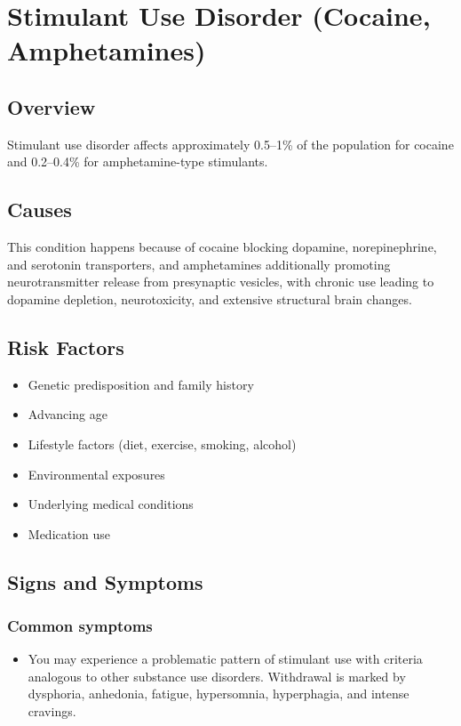 \chapter{Stimulant Use Disorder (Cocaine, Amphetamines)}
\label{sec:Stimulant Use Disorder (Cocaine, Amphetamines)}

\section{Overview}
Stimulant use disorder affects approximately 0.5--1\% of the population for cocaine and 0.2--0.4\% for amphetamine-type stimulants.
\section{Causes}
This condition happens because of cocaine blocking dopamine, norepinephrine, and serotonin transporters, and amphetamines additionally promoting neurotransmitter release from presynaptic vesicles, with chronic use leading to dopamine depletion, neurotoxicity, and extensive structural brain changes.     
\section{Risk Factors}

\begin{itemize}[noitemsep]
  \item Genetic predisposition and family history
  \item Advancing age
  \item Lifestyle factors (diet, exercise, smoking, alcohol)
  \item Environmental exposures
  \item Underlying medical conditions
  \item Medication use
\end{itemize}
\section{Signs and Symptoms}

\subsection{Common symptoms}
\begin{itemize}[noitemsep]
  \item You may experience a problematic pattern of stimulant use with criteria analogous to other substance use disorders. Withdrawal is marked by dysphoria, anhedonia, fatigue, hypersomnia, hyperphagia, and intense cravings. 
  \end{itemize}

